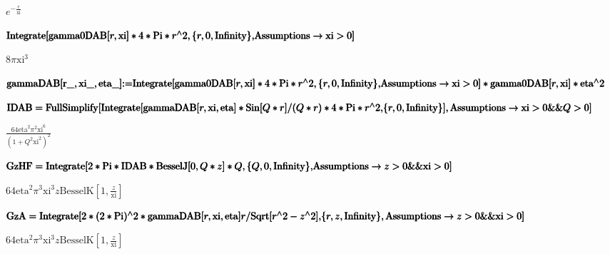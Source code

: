 \documentclass[12pt]{amsbook}
\begin{document}
\begin{doublespace}
\noindent\(e^{-\frac{r}{\text{xi}}}\)
\end{doublespace}

\begin{doublespace}
\noindent\(\pmb{\text{Integrate}[\text{gamma0DAB}[r,\text{xi}]*4*\text{Pi}*r{}^{\wedge}2,\{r,0,\text{Infinity}\},}\\
\pmb{\text{Assumptions}\to \text{xi}>0]}\)
\end{doublespace}

\begin{doublespace}
\noindent\(8 \pi  \text{xi}^3\)
\end{doublespace}

\begin{doublespace}
\noindent\(\pmb{\text{gammaDAB}[\text{r$\_$},\text{xi$\_$},\text{eta$\_$}]\text{:=}}\\
\pmb{\text{Integrate}[\text{gamma0DAB}[r,\text{xi}]*4*\text{Pi}*r{}^{\wedge}2,\{r,0,\text{Infinity}\},}\\
\pmb{\text{Assumptions}\to \text{xi}>0]*\text{gamma0DAB}[r,\text{xi}]*\text{eta}{}^{\wedge}2}\)
\end{doublespace}

\begin{doublespace}
\noindent\(\pmb{\text{IDAB}=}\\
\pmb{\text{FullSimplify}[}\\
\pmb{\text{Integrate}[\text{gammaDAB}[r,\text{xi},\text{eta}]*\text{Sin}[Q*r]/(Q*r)*4*\text{Pi}*r{}^{\wedge}2,}\\
\pmb{\{r,0,\text{Infinity}\}],\text{Assumptions}\to \text{xi}>0\&\&Q>0]}\)
\end{doublespace}

\begin{doublespace}
\noindent\(\frac{64 \text{eta}^2 \pi ^2 \text{xi}^6}{\left(1+Q^2 \text{xi}^2\right)^2}\)
\end{doublespace}

\begin{doublespace}
\noindent\(\pmb{\text{GzHF}=\text{Integrate}[2*\text{Pi}*\text{IDAB}*\text{BesselJ}[0,Q*z]*Q,\{Q,0,\text{Infinity}\},}\\
\pmb{\text{Assumptions}\to z>0\&\&\text{xi}>0]}\)
\end{doublespace}

\begin{doublespace}
\noindent\(64 \text{eta}^2 \pi ^3 \text{xi}^3 z \text{BesselK}\left[1,\frac{z}{\text{xi}}\right]\)
\end{doublespace}

\begin{doublespace}
\noindent\(\pmb{\text{GzA}=\text{Integrate}[2*(2*\text{Pi}){}^{\wedge}2*\text{gammaDAB}[r,\text{xi},\text{eta}]r/\text{Sqrt}[r{}^{\wedge}2-z{}^{\wedge}2],}\\
\pmb{\{r,z,\text{Infinity}\}, \text{Assumptions}\to z>0\&\&\text{xi}>0]}\)
\end{doublespace}

\begin{doublespace}
\noindent\(64 \text{eta}^2 \pi ^3 \text{xi}^3 z \text{BesselK}\left[1,\frac{z}{\text{xi}}\right]\)
\end{doublespace}
\end{document}
